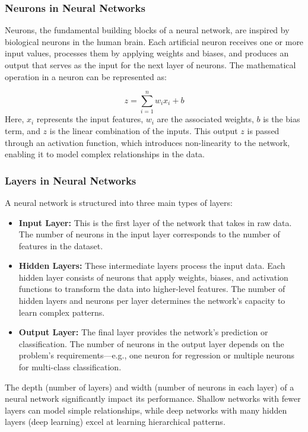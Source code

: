 \documentclass[english,12pt, titlepage]{article}
\begin{document}
	\subsubsection{Neurons in Neural Networks}
	
	Neurons, the fundamental building blocks of a neural network, are inspired by biological neurons in the human brain. Each artificial neuron receives one or more input values, processes them by applying weights and biases, and produces an output that serves as the input for the next layer of neurons. The mathematical operation in a neuron can be represented as:
	
	\begin{equation*}
		z = \sum_{i=1}^{n} w_{i}x_{i} + b
	\end{equation*}
	Here, $x_{i}$ represents the input features, $w_{i}$ are the associated weights, $b$ is the bias term, and $z$ is the linear combination of the inputs. This output $z$ is passed through an activation function, which introduces non-linearity to the network, enabling it to model complex relationships in the data.
	
	\subsubsection{Layers in Neural Networks}
	A neural network is structured into three main types of layers:
	\begin{itemize}
		\item\textbf{ Input Layer:} This is the first layer of the network that takes in raw data. The number of neurons in the input layer corresponds to the number of features in the dataset.
		\item \textbf{Hidden Layers:} These intermediate layers process the input data. Each hidden layer consists of neurons that apply weights, biases, and activation functions to transform the data into higher-level features. The number of hidden layers and neurons per layer determines the network's capacity to learn complex patterns.
		\item \textbf{Output Layer:} The final layer provides the network's prediction or classification. The number of neurons in the output layer depends on the problem's requirements—e.g., one neuron for regression or multiple neurons for multi-class classification.
	\end{itemize}
	The depth (number of layers) and width (number of neurons in each layer) of a neural network significantly impact its performance. Shallow networks with fewer layers can model simple relationships, while deep networks with many hidden layers (deep learning) excel at learning hierarchical patterns.
	
\end{document}

